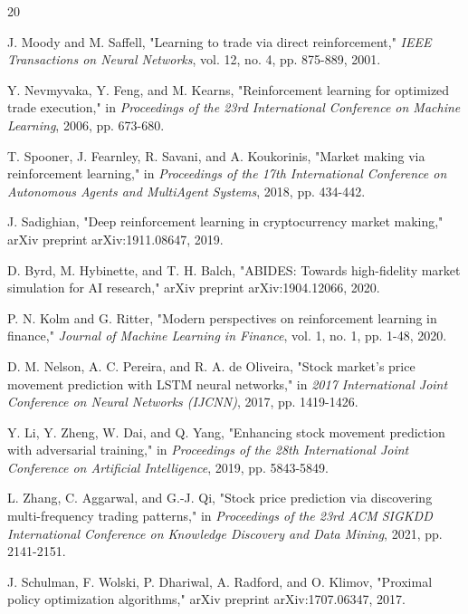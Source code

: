 \documentclass[conference]{IEEEtran}
\begin{document}
\begin{thebibliography}{20}

J. Moody and M. Saffell, "Learning to trade via direct reinforcement," \textit{IEEE Transactions on Neural Networks}, vol. 12, no. 4, pp. 875-889, 2001.

Y. Nevmyvaka, Y. Feng, and M. Kearns, "Reinforcement learning for optimized trade execution," in \textit{Proceedings of the 23rd International Conference on Machine Learning}, 2006, pp. 673-680.

T. Spooner, J. Fearnley, R. Savani, and A. Koukorinis, "Market making via reinforcement learning," in \textit{Proceedings of the 17th International Conference on Autonomous Agents and MultiAgent Systems}, 2018, pp. 434-442.

J. Sadighian, "Deep reinforcement learning in cryptocurrency market making," arXiv preprint arXiv:1911.08647, 2019.

D. Byrd, M. Hybinette, and T. H. Balch, "ABIDES: Towards high-fidelity market simulation for AI research," arXiv preprint arXiv:1904.12066, 2020.

P. N. Kolm and G. Ritter, "Modern perspectives on reinforcement learning in finance," \textit{Journal of Machine Learning in Finance}, vol. 1, no. 1, pp. 1-48, 2020.

D. M. Nelson, A. C. Pereira, and R. A. de Oliveira, "Stock market's price movement prediction with LSTM neural networks," in \textit{2017 International Joint Conference on Neural Networks (IJCNN)}, 2017, pp. 1419-1426.

Y. Li, Y. Zheng, W. Dai, and Q. Yang, "Enhancing stock movement prediction with adversarial training," in \textit{Proceedings of the 28th International Joint Conference on Artificial Intelligence}, 2019, pp. 5843-5849.

L. Zhang, C. Aggarwal, and G.-J. Qi, "Stock price prediction via discovering multi-frequency trading patterns," in \textit{Proceedings of the 23rd ACM SIGKDD International Conference on Knowledge Discovery and Data Mining}, 2021, pp. 2141-2151.

J. Schulman, F. Wolski, P. Dhariwal, A. Radford, and O. Klimov, "Proximal policy optimization algorithms," arXiv preprint arXiv:1707.06347, 2017.


\end{thebibliography}
\end{document}

